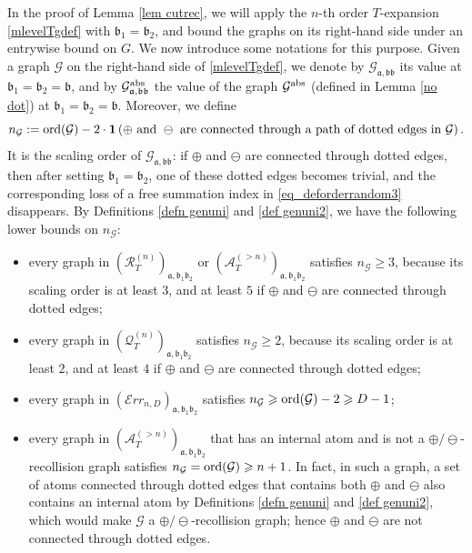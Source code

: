 \documentclass{article}
\newcommand{\1}{\mathds{1}}
\numberwithin{equation}{section}
\newcommand{\ord}{{\rm{ord}}}
\newcommand{\be}{\begin{equation}}
\newcommand{\ee}{\end{equation}}
\newcommand{\fa}{{\mathfrak a}}
\newcommand{\fb}{{\mathfrak b}}
\renewcommand{\cal}{\mathcal}
\renewcommand{\geq}{\geqslant}
\renewcommand{\ge}{\geq}
\theoremstyle{plain} %
\theoremstyle{remark}
\newcommand{\PTn}{\mathcal R_T^{(n)}}
\newcommand{\QTn}{\mathcal Q_T^{(n)}}
\newcommand{\ATn}{\mathcal A_T^{(>n)}}
\newcommand{\Err}{{\mathcal Err}}
\begin{document}
\medskip

In the proof of Lemma \ref{lem cutrec}, we will apply the $n$-th order $T$-expansion \eqref{mlevelTgdef} with $\fb_1=\fb_2$, and bound the graphs on its right-hand side under an entrywise bound on $G$. We now introduce some notations for this purpose. Given a graph $\cal G$ on the right-hand side of \eqref{mlevelTgdef}, we denote by $\cal G_{\fa,\fb\fb}$ its value at $\fb_1=\fb_2=\fb$, and by $\cal G^{\rm abs}_{\fa,\fb\fb}$ the value of the graph $\cal G^{\rm abs}$ (defined in Lemma \ref{no dot}) at $\fb_1=\fb_2=\fb$. Moreover, we define
\be\label{def nG}
n_{\cal G}:=\ord(\cal G)-2\cdot \mathbf 1\left(\oplus \text{ and } \ominus \text{ are connected through a path of dotted edges in }\cal G\right) .
\ee
It is the scaling order of $\cal G_{\fa,\fb\fb}$: if $\oplus$ and $\ominus$ are connected through dotted edges, then after setting $\fb_1=\fb_2$, one of these dotted edges becomes trivial, and the corresponding loss of a free summation index in \eqref{eq_deforderrandom3} disappears. By Definitions \ref{defn genuni} and \ref{def genuni2}, we have the following lower bounds on $n_{\cal G}$:
\begin{itemize}
\item every graph in $(\PTn)_{\fa,\fb_1\fb_2}$ or $(\ATn)_{\fa,\fb_1\fb_2}$ satisfies $n_{\cal G}\ge 3$, because its scaling order is at least $3$, and at least $5$ if $\oplus$ and $\ominus$ are connected through dotted edges;

\item every graph in $(\QTn)_{\fa,\fb_1\fb_2}$ satisfies $n_{\cal G}\ge 2$, because its scaling order is at least $2$, and at least $4$ if $\oplus$ and $\ominus$ are connected through dotted edges;

\item every graph in $(\Err_{n,D})_{\fa,\fb_1\fb_2}$ satisfies $n_{\cal G}\ge \ord(\cal G)-2\ge D-1$;

\item every graph in $(\ATn)_{\fa,\fb_1\fb_2}$ that has an internal atom and is not a $\oplus/\ominus$-recollision graph satisfies $n_{\cal G}=\ord(\cal G)\ge n+1$. In fact, in such a graph, a set of atoms connected through dotted edges that contains both $\oplus$ and $\ominus$ also contains an internal atom by Definitions \ref{defn genuni} and \ref{def genuni2}, which would make $\cal G$ a $\oplus/\ominus$-recollision graph; hence $\oplus$ and $\ominus$ are not connected through dotted edges.
\end{itemize}
\end{document}
